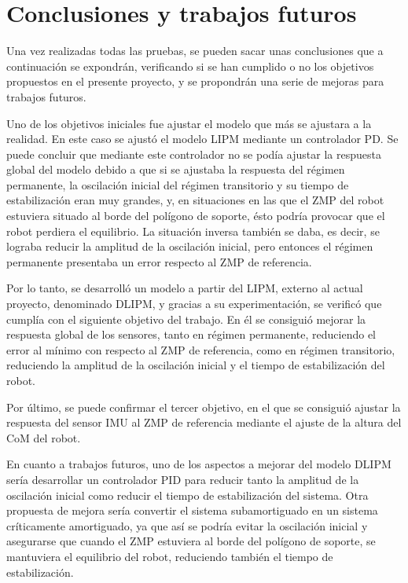 \section{Conclusiones y trabajos futuros}

Una vez realizadas todas las pruebas, se pueden sacar unas conclusiones que a continuación se expondrán, verificando si se han cumplido o no los objetivos propuestos en el presente proyecto, y se propondrán una serie de mejoras para trabajos futuros.

Uno de los objetivos iniciales fue ajustar el modelo que más se ajustara a la realidad. En este caso se ajustó el modelo LIPM mediante un controlador PD. Se puede concluir que mediante este controlador no se podía ajustar la respuesta global del modelo debido a que si se ajustaba la respuesta del régimen permanente, la oscilación inicial del régimen transitorio y su tiempo de estabilización eran muy grandes, y, en situaciones en las que el ZMP del robot estuviera situado al borde del polígono de soporte, ésto podría provocar que el robot perdiera el equilibrio. La situación inversa también se daba, es decir, se lograba reducir la amplitud de la oscilación inicial, pero entonces el régimen permanente presentaba un error respecto al ZMP de referencia.

Por lo tanto, se desarrolló un modelo a partir del LIPM, externo al actual proyecto, denominado DLIPM, y gracias a su experimentación, se verificó que cumplía con el siguiente objetivo del trabajo. En él se consiguió mejorar la respuesta global de los sensores, tanto en régimen permanente, reduciendo el error al mínimo con respecto al ZMP de referencia, como en régimen transitorio, reduciendo la amplitud de la oscilación inicial y el tiempo de estabilización del robot.

Por último, se puede confirmar el tercer objetivo, en el que se consiguió ajustar la respuesta del sensor IMU al ZMP de referencia mediante el ajuste de la altura del CoM del robot.

En cuanto a trabajos futuros, uno de los aspectos a mejorar del modelo DLIPM sería desarrollar un controlador PID para reducir tanto la amplitud de la oscilación inicial como reducir el tiempo de estabilización del sistema. Otra propuesta de mejora sería convertir el sistema subamortiguado en un sistema críticamente amortiguado, ya que así se podría evitar la oscilación inicial y asegurarse que cuando el ZMP estuviera al borde del polígono de soporte, se mantuviera el equilibrio del robot, reduciendo  también el tiempo de estabilización.